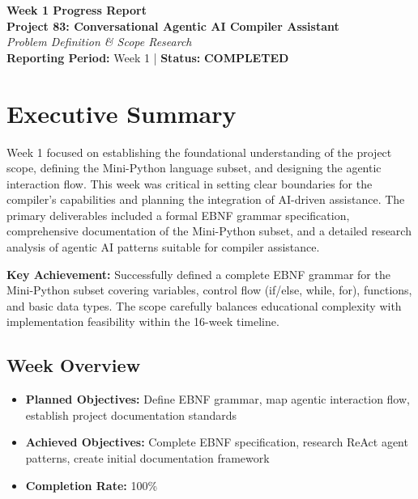 \documentclass[a4paper,11pt]{article}
\newcommand{\statusgood}[1]{\colorbox{green!20}{\textbf{#1}}}
\begin{document}
\begin{center}
    {\huge \textbf{Week 1 Progress Report}} \\
    \vspace{3mm}
    {\large \textbf{Project 83: Conversational Agentic AI Compiler Assistant}} \\
    \vspace{2mm}
    \textit{Problem Definition \& Scope Research} \\
    \vspace{2mm}
    \textbf{Reporting Period:} Week 1 | \textbf{Status:} \statusgood{COMPLETED}
\end{center}

\vspace{5mm}

\section{Executive Summary}

Week 1 focused on establishing the foundational understanding of the project scope, defining the Mini-Python language subset, and designing the agentic interaction flow. This week was critical in setting clear boundaries for the compiler's capabilities and planning the integration of AI-driven assistance. The primary deliverables included a formal EBNF grammar specification, comprehensive documentation of the Mini-Python subset, and a detailed research analysis of agentic AI patterns suitable for compiler assistance.

\textbf{Key Achievement:} Successfully defined a complete EBNF grammar for the Mini-Python subset covering variables, control flow (if/else, while, for), functions, and basic data types. The scope carefully balances educational complexity with implementation feasibility within the 16-week timeline.

\subsection{Week Overview}

\begin{itemize}[leftmargin=*]
    \item \textbf{Planned Objectives:} Define EBNF grammar, map agentic interaction flow, establish project documentation standards
    \item \textbf{Achieved Objectives:} Complete EBNF specification, research ReAct agent patterns, create initial documentation framework
    \item \textbf{Completion Rate:} 100\%
\end{itemize}
\end{document}
